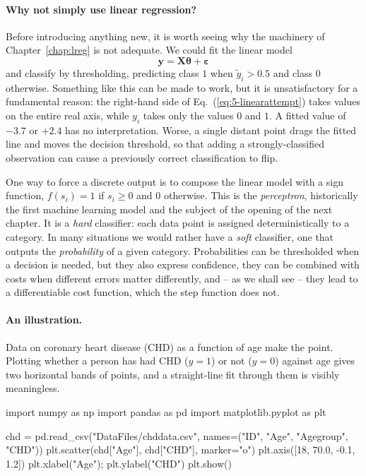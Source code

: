 \paragraph{Why not simply use linear regression?}
Before introducing anything new, it is worth seeing why the machinery of
Chapter~\ref{chap:lreg} is not adequate.  We could fit the linear model
\begin{equation}
  \bm{y} = \bm{X}\bm{\theta} + \bm{\varepsilon}
  \label{eq:5-linearattempt}
\end{equation}
and classify by thresholding, predicting class $1$ when
$\tilde{y}_i>0.5$ and class $0$ otherwise.  Something like this can be made
to work, but it is unsatisfactory for a fundamental reason: the right-hand
side of Eq.~(\ref{eq:5-linearattempt}) takes values on the entire real axis,
while $y_i$ takes only the values $0$ and $1$.  A fitted value of $-3.7$ or
$+2.4$ has no interpretation.  Worse, a single distant point drags the fitted
line and moves the decision threshold, so that adding a strongly-classified
observation can cause a previously correct classification to flip.

One way to force a discrete output is to compose the linear model with a sign
function, $f(s_i)=1$ if $s_i\ge0$ and $0$ otherwise.  This is the
\emph{perceptron}, historically the first machine learning model and the
subject of the opening of the next chapter.  It is a \emph{hard} classifier:
each data point is assigned deterministically to a category.  In many
situations we would rather have a \emph{soft} classifier, one that outputs
the \emph{probability} of a given category.  Probabilities can be thresholded
when a decision is needed, but they also express confidence, they can be
combined with costs when different errors matter differently, and -- as we
shall see -- they lead to a differentiable cost function, which the step
function does not.

\paragraph{An illustration.}
Data on coronary heart disease (CHD) as a function of age make the point.
Plotting whether a person has had CHD ($y=1$) or not ($y=0$) against age gives
two horizontal bands of points, and a straight-line fit through them is
visibly meaningless.

\begin{Python}{}
import numpy as np
import pandas as pd
import matplotlib.pyplot as plt

chd = pd.read_csv("DataFiles/chddata.csv", names=("ID", "Age", "Agegroup", "CHD"))
plt.scatter(chd["Age"], chd["CHD"], marker="o")
plt.axis([18, 70.0, -0.1, 1.2])
plt.xlabel("Age"); plt.ylabel("CHD")
plt.show()
\end{Python}

